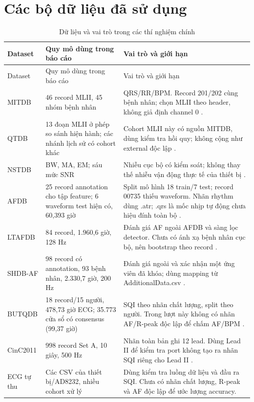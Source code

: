 \documentclass[12pt,a4paper,oneside]{report}
\begin{document}
\section{Các bộ dữ liệu đã sử dụng}
\begin{longtable}{L{2.1cm}L{3.8cm}L{8.6cm}}
\caption{Dữ liệu và vai trò trong các thí nghiệm chính}\label{tab:datasets}\\
\toprule Dataset & Quy mô dùng trong báo cáo & Vai trò và giới hạn\\\midrule\endfirsthead
\toprule Dataset & Quy mô dùng trong báo cáo & Vai trò và giới hạn\\\midrule\endhead
MITDB & 46 record MLII, 45 nhóm bệnh nhân & QRS/RR/BPM. Record 201/202 cùng bệnh nhân; chọn MLII theo header, không giả định channel 0 \cite{mitdb}.\\
QTDB & 13 đoạn MLII ở phép so sánh hiện hành; các nhánh lịch sử có cohort khác & Cohort MLII này có nguồn MITDB, dùng kiểm tra hồi quy; không cộng như external độc lập \cite{qtdb}.\\
NSTDB & BW, MA, EM; sáu mức SNR & Nhiễu cục bộ có kiểm soát; không thay thế nhiễu vận động thực tế của thiết bị \cite{nstdb}.\\
AFDB & 25 record annotation cho tập feature; 6 waveform test hiện có, 60,393 giờ & Split mô hình 18 train/7 test; record 00735 thiếu waveform. Nhãn rhythm dùng .atr; .qrs là mốc nhịp tự động chưa hiệu đính toàn bộ \cite{afdb}.\\
LTAFDB & 84 record, 1.960,6 giờ, 128 Hz & Đánh giá AF ngoài AFDB và sàng lọc detector. Chưa có ánh xạ bệnh nhân cục bộ, nên bootstrap theo record \cite{ltafdb}.\\
SHDB-AF & 98 record có annotation, 93 bệnh nhân, 2.330,7 giờ, 200 Hz & Đánh giá ngoài và xác nhận một ứng viên đã khóa; dùng mapping từ AdditionalData.csv \cite{shdbaf}.\\
BUTQDB & 18 record/15 người, 478,73 giờ ECG; 35.773 cửa sổ có consensus (99,37 giờ) & SQI theo nhãn chất lượng, split theo người. Trong lượt này không có nhãn AF/R-peak độc lập để chấm AF/BPM \cite{butqdb}.\\
CinC2011 & 998 record Set A, 10 giây, 500 Hz & Nhãn toàn bản ghi 12 lead. Dùng Lead II để kiểm tra port không tạo ra nhãn SQI riêng cho Lead II \cite{cinc2011}.\\
ECG tự thu & Các CSV của thiết bị/AD8232, nhiều cohort xử lý & Dùng kiểm tra luồng dữ liệu và đầu ra SQI. Chưa có nhãn chất lượng, R-peak và AF độc lập để ước lượng accuracy.\\
\bottomrule
\end{longtable}
\end{document}
